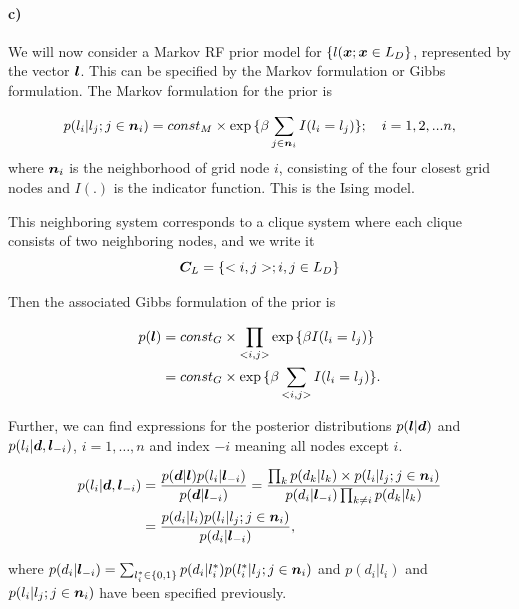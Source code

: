 \paragraph{c)}
We will now consider a Markov RF prior model for $\{l(\bm{x}; \bm{x} \in L_D\}$, represented by the vector $\bm{l}$.
This can be specified by the Markov formulation or Gibbs formulation. The Markov formulation for the prior is 

\begin{equation}
    p(l_i|l_j; j \in \bm{n}_i) = const_M \times \exp{\{\beta \sum_{j\in \bm{n}_i} I(l_i = l_j)\}}; \quad i = 1,2,...n,
\end{equation}
where $\bm{n}_i$ is the neighborhood of grid node $i$, consisting of the four closest grid nodes and $I(.)$ is the indicator function. This is the Ising model. 

This neighboring system corresponds to a clique system where each clique consists of two neighboring nodes, and we write it
\begin{equation}
    \bm{C}_L = \{<i,j>; i,j \in L_D\}
\end{equation}

Then the associated Gibbs formulation of the prior is

\begin{align}
    p(\bm{l}) &= const_G \times \prod_{<i,j>} \exp{\{\beta I(l_i = l_j)\}}\\
    & = const_G \times \exp{\{\beta \sum_{<i,j>} I(l_i = l_j)\}}.
\end{align}

Further, we can find expressions for the posterior distributions $p(\bm{l}|\bm{d})$ and $p(l_i | \bm{d}, \bm{l}_{-i})$, $i = 1, \dots, n$ and index $-i$ meaning all nodes except $i$. 

\begin{align}
\begin{split}
    p(l_i | \bm{d}, \bm{l}_{-i}) &= \frac{p(\bm{d}|\bm{l})p(l_i|\bm{l}_{-i})}{p(\bm{d}|\bm{l}_{-i})}  = \frac{\prod_{k} p(d_k|l_k)\times p(l_i|l_j; j\in \bm{n}_i)}{p(d_i|\bm{l}_{-i})\prod_{k\neq i}p(d_k|l_k)}\\
    & = \frac{p(d_i|l_i)p(l_i|l_j; j\in \bm{n}_i)}{p(d_i|\bm{l}_{-i})},
\end{split}
\label{eq:full_cond}
\end{align}

where $p(d_i|\bm{l}_{-i}) = \sum_{l_i^*\in \{0,1\}} p(d_i|l_i^*)p(l_i^*|l_j; j\in \bm{n}_i)$ and $p(d_i|l_i)$ and $p(l_i|l_j; j\in \bm{n}_i)$ have been specified previously. 

